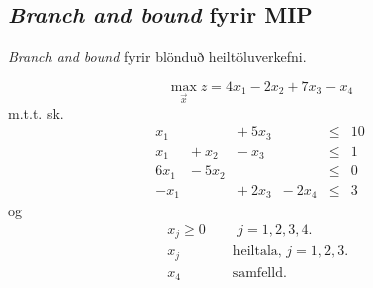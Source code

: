 \subsection{\emph{Branch and bound} fyrir MIP}
\emph{Branch and bound} fyrir blönduð heiltöluverkefni.
\begin{daemi}
$$ \max_{\vec{x}} z = 4 x_1 - 2  x_2 + 7 x_3 - x_4$$
m.t.t. sk. 
\[\begin{array}{rrrrcl}
  x_1 &        &+~ 5 x_3 &        & \le & 10 \\
  x_1 &+~x_2   &-~   x_3 &        & \le & 1 \\
 6x_1 &-~ 5x_2 &         &        & \le & 0 \\
 -x_1 &        &+~  2x_3 & -~2x_4 & \le & 3
\end{array}\]
og
\begin{eqnarray*}
x_j \geq 0&& \mbox{ $j=1,2,3,4$. }\\
x_j && \mbox{ heiltala, $j=1,2,3$. }\\
x_4 &&  \mbox{ samfelld.}
\end{eqnarray*}
\end{daemi}



